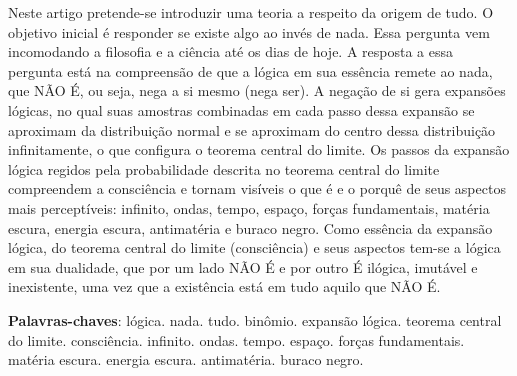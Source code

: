 \vspace{-20mm}
\maketitle
\vspace{-8mm}
\begin{resumoumacoluna}
\vspace{-2mm}
	Neste artigo pretende-se introduzir uma teoria a respeito da origem de tudo. O objetivo inicial é responder se existe algo ao invés de nada. Essa pergunta vem incomodando a filosofia e a ciência até os dias de hoje. A resposta a essa pergunta está na compreensão de que a lógica em sua essência remete ao nada, que NÃO É, ou seja, nega a si mesmo (nega ser). A negação de si gera expansões lógicas, no qual suas amostras combinadas em cada passo dessa expansão se aproximam da distribuição normal e se aproximam do centro dessa distribuição infinitamente, o que configura o teorema central do limite. Os passos da expansão lógica regidos pela probabilidade descrita no teorema central do limite compreendem a consciência e tornam visíveis o que é e o porquê de seus aspectos mais perceptíveis: infinito, ondas, tempo, espaço, forças fundamentais, matéria escura, energia escura, antimatéria e buraco negro. Como essência da expansão lógica, do teorema central do limite (consciência) e seus aspectos tem-se a lógica em sua dualidade, que por um lado NÃO É e por outro É ilógica, imutável e inexistente, uma vez que a existência está em tudo aquilo que NÃO É.
 \noindent
 
 \textbf{Palavras-chaves}: lógica. nada. tudo. binômio. expansão lógica. teorema central do limite. consciência. infinito. ondas. tempo. espaço. forças fundamentais. matéria escura. energia escura. antimatéria. buraco negro.
\end{resumoumacoluna}

